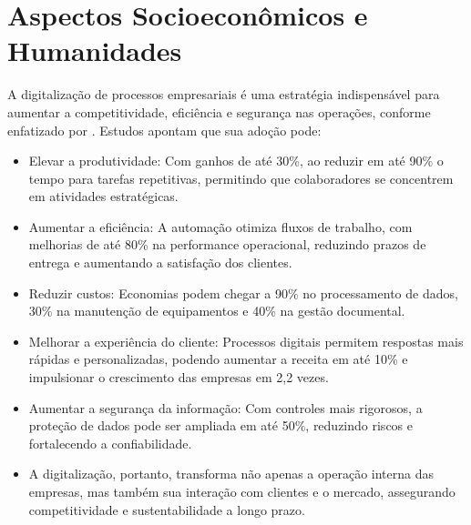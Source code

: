 
\chapter{Aspectos Socioeconômicos e Humanidades}\label{chap:humanidades} %
A digitalização de processos empresariais é uma estratégia indispensável para aumentar a competitividade, eficiência e segurança nas operações, conforme enfatizado por
\cite{sebraeDigitalizacaoProcessos}. Estudos apontam que sua adoção pode:
\begin{itemize}
	\item Elevar a produtividade: Com ganhos de até 30\%, ao reduzir em até 90\% o tempo para tarefas repetitivas, permitindo que colaboradores se concentrem em atividades estratégicas.
	\item Aumentar a eficiência: A automação otimiza fluxos de trabalho, com melhorias de até 80\% na performance operacional, reduzindo prazos de entrega e aumentando a satisfação dos
	clientes.
	\item Reduzir custos: Economias podem chegar a 90\% no processamento de dados, 30\% na manutenção de equipamentos e 40\% na gestão documental.
	\item Melhorar a experiência do cliente: Processos digitais permitem respostas mais rápidas e personalizadas, podendo aumentar a receita em até 10\% e impulsionar o crescimento
	das empresas em 2,2 vezes.
	\item Aumentar a segurança da informação: Com controles mais rigorosos, a proteção de dados pode ser ampliada em até 50\%, reduzindo riscos e fortalecendo a confiabilidade.
	\item A digitalização, portanto, transforma não apenas a operação interna das empresas, mas também sua interação com clientes e o mercado, assegurando competitividade e 
	sustentabilidade a longo prazo.
\end{itemize}
	